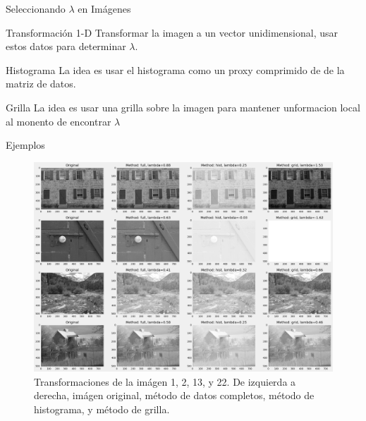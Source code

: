 \documentclass{beamer}
\begin{document}
\begin{frame}{Seleccionando $\lambda$ en Im\'agenes}
     
    \begin{block}{Transformación 1-D}
        Transformar la imagen a un vector unidimensional, usar estos datos para determinar $\lambda$.
    \end{block}
    
         
    \begin{block}{Histograma}
        La idea es usar el histograma como un proxy comprimido de de la matriz de datos. 
    \end{block}
    
         
    \begin{block}{Grilla}
        La idea es usar una grilla sobre la imagen para mantener unformacion local al monento de encontrar $\lambda$
    \end{block}

\end{frame}

\begin{frame}{Ejemplos}
    \begin{figure}[H]
        \centering
        \includegraphics[width=\textwidth]{img_bci_all.png}
        \caption{Transformaciones de la im\'agen 1, 2, 13, y 22. De izquierda a derecha, im\'agen original, m\'etodo de datos completos, m\'etodo de histograma, y m\'etodo de grilla.}
        \label{fig:img_bci_all}
    \end{figure}
    
\end{frame}
\end{document}
